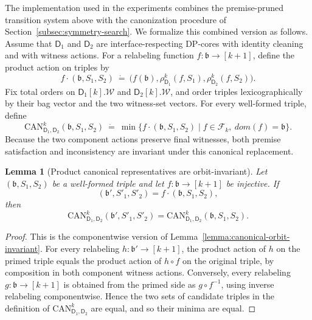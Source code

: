\documentclass[11pt,a4paper]{article}
\newtheorem{lemma}[theorem]{Lemma}
\newcommand{\treewidthvalue}{k}
\newcommand{\abag}{\mathfrak{b}}
\newcommand{\defeq}{~\dot{=}~}
\newcommand{\allwitnesses}{\mathcal{W}}
\newcommand{\dpcore}{\mathsf{D}}
\newcommand{\witnessset}{S}
\newcommand{\domain}{dom}
\newcommand{\relabelclass}{\mathcal{F}}
\newcommand{\action}{\rho}
\newcommand{\canonic}{\mathrm{CAN}}
\begin{document}
The implementation used in the experiments combines the premise-pruned transition system above with the canonization procedure of Section~\ref{subsec:symmetry-search}. We formalize this combined version as follows. Assume that $\dpcore_1$ and $\dpcore_2$ are interface-respecting DP-cores with identity cleaning and with witness actions. For a relabeling function $f:\abag\to[\treewidthvalue+1]$, define the product action on triples by
\[
f\cdot(\abag,\witnessset_1,\witnessset_2)
\defeq
\bigl(f(\abag),\action_{\dpcore_1}^{\treewidthvalue}(f,\witnessset_1),
\action_{\dpcore_2}^{\treewidthvalue}(f,\witnessset_2)\bigr).
\]
Fix total orders on $\dpcore_1[\treewidthvalue].\allwitnesses$ and $\dpcore_2[\treewidthvalue].\allwitnesses$, and order triples lexicographically by their bag vector and the two witness-set vectors. For every well-formed triple, define
\[
\canonic_{\dpcore_1,\dpcore_2}^{k}(\abag,\witnessset_1,\witnessset_2)
\defeq
\min\{f\cdot(\abag,\witnessset_1,\witnessset_2)\mid f\in\relabelclass_{\treewidthvalue},\ \domain(f)=\abag\}.
\]
Because the two component actions preserve final witnesses, both premise satisfaction and inconsistency are invariant under this canonical replacement.

\begin{lemma}[Product canonical representatives are orbit-invariant]
\label{lemma:product-canonical-orbit-invariant}
Let $(\abag,\witnessset_1,\witnessset_2)$ be a well-formed triple and let $f:\abag\to[\treewidthvalue+1]$ be injective. If
\[
(\abag',\witnessset'_1,\witnessset'_2)=f\cdot(\abag,\witnessset_1,\witnessset_2),
\]
then
\[
\canonic_{\dpcore_1,\dpcore_2}^{k}(\abag',\witnessset'_1,\witnessset'_2)
=
\canonic_{\dpcore_1,\dpcore_2}^{k}(\abag,\witnessset_1,\witnessset_2).
\]
\end{lemma}
\begin{proof}
This is the componentwise version of Lemma~\ref{lemma:canonical-orbit-invariant}. For every relabeling $h:\abag'\to[\treewidthvalue+1]$, the product action of $h$ on the primed triple equals the product action of $h\circ f$ on the original triple, by composition in both component witness actions. Conversely, every relabeling $g:\abag\to[\treewidthvalue+1]$ is obtained from the primed side as $g\circ f^{-1}$, using inverse relabeling componentwise. Hence the two sets of candidate triples in the definition of $\canonic_{\dpcore_1,\dpcore_2}^{k}$ are equal, and so their minima are equal.
\end{proof}
\end{document}
